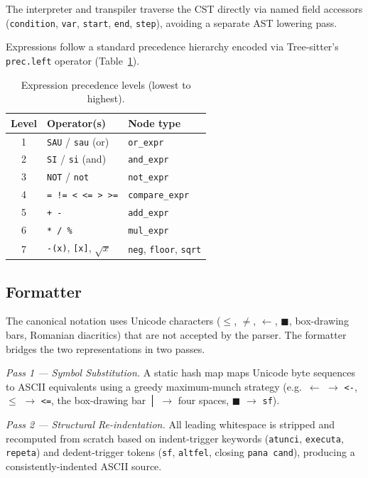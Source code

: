 \documentclass[conference]{IEEEtran}
\begin{document}
The interpreter and transpiler traverse the CST directly via named field
accessors (\texttt{condition}, \texttt{var}, \texttt{start}, \texttt{end},
\texttt{step}), avoiding a separate AST lowering pass.

Expressions follow a standard precedence hierarchy encoded via Tree-sitter's
\texttt{prec.left} operator (Table~\ref{tab:prec}).

\begin{table}[h]
\centering
\small
\caption{Expression precedence levels (lowest to highest).}
\label{tab:prec}
\begin{tabular}{cll}
\toprule
\textbf{Level} & \textbf{Operator(s)} & \textbf{Node type} \\
\midrule
1 & \texttt{SAU} / \texttt{sau} (or)    & \texttt{or\_expr}  \\
2 & \texttt{SI} / \texttt{si} (and)     & \texttt{and\_expr} \\
3 & \texttt{NOT} / \texttt{not}         & \texttt{not\_expr} \\
4 & \texttt{= != < <= > >=}             & \texttt{compare\_expr} \\
5 & \texttt{+ -}                        & \texttt{add\_expr} \\
6 & \texttt{* / \%}                     & \texttt{mul\_expr} \\
7 & \texttt{-(x)}, \texttt{[x]}, $\sqrt{x}$ & \texttt{neg}, \texttt{floor}, \texttt{sqrt} \\
\bottomrule
\end{tabular}
\end{table}

\subsection{Formatter}

The canonical notation uses Unicode characters ($\leq$, $\neq$, $\leftarrow$,
$\blacksquare$, box-drawing bars, Romanian diacritics) that are not accepted
by the parser.  The formatter bridges the two representations in two passes.

\emph{Pass 1 --- Symbol Substitution.}  A static hash map maps Unicode byte
sequences to ASCII equivalents using a greedy maximum-munch strategy
(e.g.\ $\leftarrow$ $\to$ \texttt{<-}, $\leq$ $\to$ \texttt{<=}, the
box-drawing bar │ $\to$ four spaces, $\blacksquare$ $\to$ \texttt{sf}).

\emph{Pass 2 --- Structural Re-indentation.}  All leading whitespace is
stripped and recomputed from scratch based on indent-trigger keywords
(\texttt{atunci}, \texttt{executa}, \texttt{repeta}) and dedent-trigger
tokens (\texttt{sf}, \texttt{altfel}, closing \texttt{pana cand}), producing
a consistently-indented ASCII source.
\end{document}
